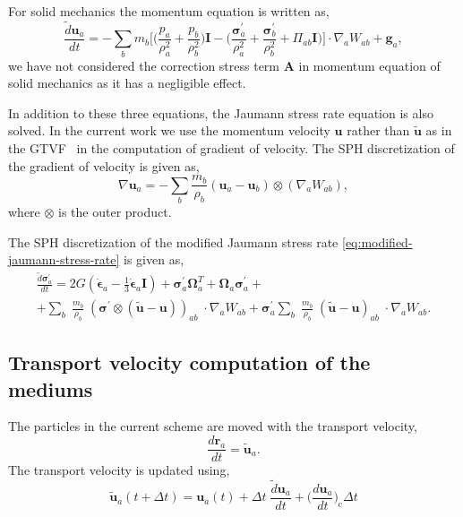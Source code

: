 \documentclass[preprint,12pt]{elsarticle}
\newcommand{\teng}[1]{\ensuremath{\boldsymbol{#1}}}
\newcommand{\ten}[1]{\ensuremath{\mathbf{#1}}}
\begin{document}
%
For solid mechanics the momentum equation is written as,
\begin{equation}
  \label{eq:sph-momentum-solid}
  \frac{\tilde{d}\ten{u}_{a}}{dt} = - \sum_{b} m_b \bigg[
  \bigg(\frac{p_a}{\rho_a^2} + \frac{p_b}{\rho_b^2}\bigg) \ten{I} -
  \bigg(\frac{\teng{\sigma}^{'}_{a}}{\rho_a^2} +
  \frac{\teng{\sigma}^{'}_{b}}{\rho_b^2} + \Pi_{ab} \ten{I} \bigg) \bigg]  \cdot \nabla_{a} W_{ab} +
  \ten{g}_{a},
\end{equation}
we have not considered the correction stress term $\ten{A}$ in momentum
equation of solid mechanics as it has a negligible effect.

In addition to these three equations, the Jaumann stress rate equation is also
solved. In the current work we use the momentum velocity $\ten{u}$ rather than
$\tilde{\ten{u}}$ as in the GTVF~\cite{zhang_hu_adams17} in the computation of
gradient of velocity. The SPH discretization of the gradient of velocity is
given as,
\begin{equation}
  \label{eq:sph-vel-grad}
  \nabla \ten{u}_a =
  - \sum_{b} \frac{m_b}{\rho_{b}} (\ten{u}_{a} - \ten{u}_{b}) \otimes (\nabla_{a} W_{ab}),
\end{equation}
where $\otimes$ is the outer product.

The SPH discretization of the modified Jaumann stress rate
\cref{eq:modified-jaumann-stress-rate} is given as,
\begin{multline}
  \label{eq:sph-modified-jaumann-stress}
  \frac{\tilde{d}\teng{\sigma}^{'}_{a}}{dt} = 2G (\dot{\teng{\epsilon}}_{a} -
  \frac{1}{3} \dot{\teng{\epsilon}}_{a} \ten{I}) + \teng{\sigma}^{'}_{a}
  \teng{\Omega}_{a}^{T} +
  \teng{\Omega}_{a} \teng{\sigma}^{'}_{a} + \\
  + \sum_{b} \; \frac{m_b}{\rho_{b}} \; (\teng{\sigma}^{'} \otimes (\tilde{\ten{u}} -
  \ten{u}))_{ab} \; \cdot \nabla_{a} W_{ab}
  + \teng{\sigma}^{'}_{a} \sum_{b} \; \frac{m_b}{\rho_{b}} \;
  (\tilde{\ten{u}} - \ten{u})_{ab} \; \cdot \nabla_{a} W_{ab}.
\end{multline}


\subsection{Transport velocity computation of the mediums}

The particles in the current scheme are moved with the transport velocity,
\begin{equation}
  \label{eq:transport_velocity_position_derivative}
  \frac{d\ten{r}_a}{dt} = \ten{\tilde{u}}_a.
\end{equation}
%
The transport velocity is updated using,
\begin{equation}
  \label{eq:transport_velocity}
  \ten{\tilde{u}}_a(t + \Delta t) =\ten{u}_a(t) + \Delta t \; \frac{\tilde{d} \ten{u}_a}{dt} +
  \bigg(\frac{d \ten{u}_{a}}{dt}\bigg)_{\text{c}} \Delta t
\end{equation}
\end{document}
